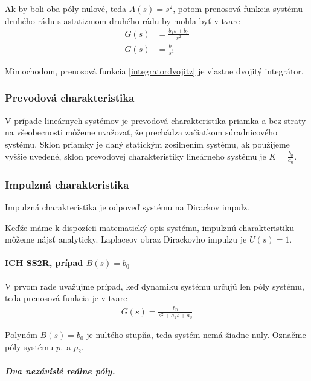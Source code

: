 \documentclass[a4paper, 10pt, ]{article}
\begin{document}
Ak by boli oba póly nulové, teda $A(s) = s^2$, potom prenosová funkcia systému druhého rádu s astatizmom druhého rádu by mohla byť v tvare
\begin{subequations}
    \begin{align}
        G(s) &= \frac{b_1 s + b_0}{s^2} \\
        G(s) &= \frac{b_0}{s^2} \label{integratordvojitz}
    \end{align}
\end{subequations}

Mimochodom, prenosová funkcia \eqref{integratordvojitz} je vlastne dvojitý integrátor.


\subsubsection{Prevodová charakteristika}

V prípade lineárnych systémov je prevodová charakteristika priamka a bez straty na všeobecnosti môžeme uvažovať, že prechádza začiatkom súradnicového systému. Sklon priamky je daný statickým zosilnením systému, ak použijeme vyššie uvedené, sklon prevodovej charakteristiky lineárneho systému je $K = \frac{b_0}{a_0}$.


\subsubsection{Impulzná charakteristika}

Impulzná charakteristika je odpoveď systému na Dirackov impulz.

Keďže máme k dispozícii matematický opis systému, impulznú charakteristiku môžeme nájsť analyticky. Laplaceov obraz Dirackovho impulzu je $U(s) = 1$.


\paragraph{ICH SS2R, prípad $B(s) = b_0$}

V prvom rade uvažujme prípad, keď dynamiku systému určujú len póly systému, teda prenosová funkcia je v tvare
\begin{align}
    G(s) =  \frac{b_0}{s^2 + a_1 s + a_0}
\end{align}

Polynóm $B(s) = b_0$ je nultého stupňa, teda systém nemá žiadne nuly. Označme póly systému $p_1$ a $p_2$. 



\subparagraph{Dva nezávislé reálne póly.}
\end{document}
